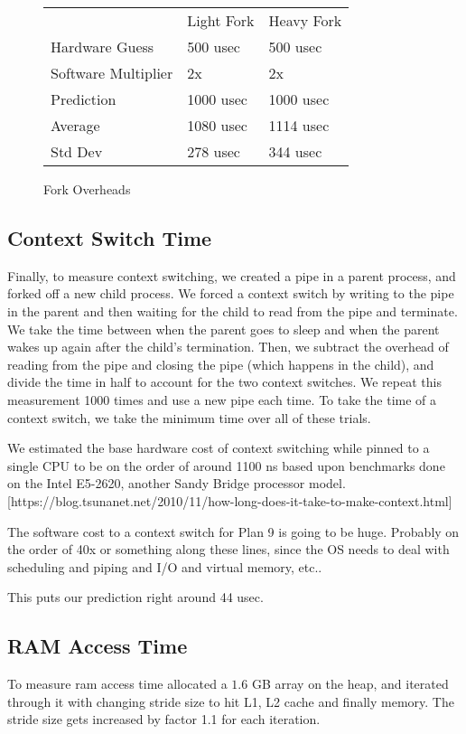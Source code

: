\documentclass[letterpaper,twocolumn,10pt]{article}
\begin{document}
\begin{figure}
	\centering
\begin{tabular}{lll}
        & Light Fork & Heavy Fork \\
Hardware Guess & 500 usec                 & 500 usec                  \\
Software Multiplier & 2x                 & 2x                  \\
Prediction & 1000 usec                 & 1000 usec                  \\
Average & 1080 usec                 & 1114 usec                  \\
Std Dev & 278 usec                  & 344 usec                  
\end{tabular}
\caption{Fork Overheads}
\label{tab:forkoverheads}
\end{figure}

\subsection{Context Switch Time}

Finally, to measure context switching, we created a pipe in a parent process,
and forked off a new child process. We forced a context switch by writing to
the pipe in the parent and then waiting for the child to read from the pipe
and terminate. We take the time between when the parent goes to sleep and when
the parent wakes up again after the child's termination. Then, we subtract
the overhead of reading from the pipe and closing the pipe (which happens in
the child), and divide the time in half to account for the two context switches.
We repeat this measurement 1000 times and use a new pipe each time. To take
the time of a context switch, we take the minimum time over all of these trials.

We estimated the base hardware cost of context switching while pinned to a single CPU to
be on the order of around 1100 ns based upon benchmarks done on the Intel E5-2620, another
Sandy Bridge processor model. [https://blog.tsunanet.net/2010/11/how-long-does-it-take-to-make-context.html]

The software cost to a context switch for Plan 9 is going to be huge. Probably on the order of 40x or something along these lines, since the OS needs to deal with scheduling and piping and I/O and virtual memory, etc..

This puts our prediction right around 44 usec.

\subsection{RAM Access Time}
To measure ram access time allocated a $1.6$ GB array on the heap, and iterated through it with changing stride size to hit L1, L2 cache and finally memory. The stride size gets increased by factor 1.1 for each iteration.
\end{document}
